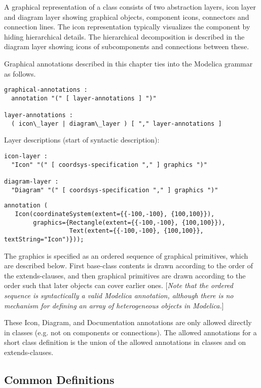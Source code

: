 A graphical representation of a class consists of two abstraction
layers, icon layer and diagram layer showing graphical objects,
component icons, connectors and connection lines. The icon
representation typically visualizes the component by hiding hierarchical
details. The hierarchical decomposition is described in the diagram
layer showing icons of subcomponents and connections between these.

Graphical annotations described in this chapter ties into the Modelica
grammar as follows.
\begin{lstlisting}[language=grammar]
graphical-annotations :
  annotation "(" [ layer-annotations ] ")"

layer-annotations :
  ( icon\_layer | diagram\_layer ) [ "," layer-annotations ]
\end{lstlisting}
Layer descriptions (start of syntactic description):
\begin{lstlisting}[language=grammar]
icon-layer :
  "Icon" "(" [ coordsys-specification "," ] graphics ")"

diagram-layer :
  "Diagram" "(" [ coordsys-specification "," ] graphics ")"
\end{lstlisting}

\begin{example}
\begin{lstlisting}[language=modelica]
annotation (
   Icon(coordinateSystem(extent={{-100,-100}, {100,100}}),
        graphics={Rectangle(extent={{-100,-100}, {100,100}}),
                  Text(extent={{-100,-100}, {100,100}}, textString="Icon")}));
\end{lstlisting}
\end{example}

The graphics is specified as an ordered sequence of graphical
primitives, which are described below. First base-class contents is
drawn according to the order of the extends-clauses, and then graphical
primitives are drawn according to the order such that later objects can
cover earlier ones. {[}\emph{Note that the ordered sequence is
syntactically a valid Modelica annotation, although there is no
mechanism for defining an array of heterogeneous objects in
Modelica.}{]}

These Icon, Diagram, and Documentation annotations are only allowed
directly in classes (e.g. not on components or connections). The allowed
annotations for a short class definition is the union of the allowed
annotations in classes and on extends-clauses.

\subsection{Common Definitions}


